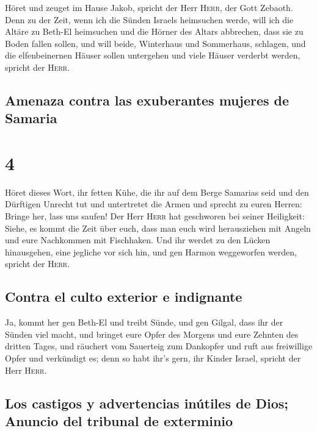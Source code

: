 Höret und zeuget im Hause Jakob, spricht der Herr
\textsc{Herr}, der Gott Zebaoth.  Denn zu der Zeit, wenn
ich die Sünden Israels heimsuchen werde, will ich die Altäre zu Beth-El
heimsuchen und die Hörner des Altars abbrechen, dass sie zu Boden fallen
sollen,  und will beide, Winterhaus und Sommerhaus,
schlagen, und die elfenbeinernen Häuser sollen untergehen und viele
Häuser verderbt werden, spricht der \textsc{Herr}.

\hypertarget{amenaza-contra-las-exuberantes-mujeres-de-samaria}{%
\subsection{Amenaza contra las exuberantes mujeres de
Samaria}\label{amenaza-contra-las-exuberantes-mujeres-de-samaria}}

\hypertarget{section-3}{%
\section{4}\label{section-3}}

 Höret dieses Wort, ihr fetten Kühe, die ihr auf dem Berge
Samarias seid und den Dürftigen Unrecht tut und untertretet die Armen
und sprecht zu euren Herren: Bringe her, lass uns saufen! 
Der Herr \textsc{Herr} hat geschworen bei seiner Heiligkeit: Siehe, es
kommt die Zeit über euch, dass man euch wird herausziehen mit Angeln und
eure Nachkommen mit Fischhaken.  Und ihr werdet zu den
Lücken hinausgehen, eine jegliche vor sich hin, und gen Harmon
weggeworfen werden, spricht der \textsc{Herr}.

\hypertarget{contra-el-culto-exterior-e-indignante}{%
\subsection{Contra el culto exterior e
indignante}\label{contra-el-culto-exterior-e-indignante}}

 Ja, kommt her gen Beth-El und treibt Sünde, und gen
Gilgal, dass ihr der Sünden viel macht, und bringet eure Opfer des
Morgens und eure Zehnten des dritten Tages,  und räuchert
vom Sauerteig zum Dankopfer und ruft aus freiwillige Opfer und
verkündigt es; denn so habt ihr's gern, ihr Kinder Israel, spricht der
Herr \textsc{Herr}.

\hypertarget{los-castigos-y-advertencias-inuxfatiles-de-dios-anuncio-del-tribunal-de-exterminio}{%
\subsection{Los castigos y advertencias inútiles de Dios; Anuncio del
tribunal de
exterminio}\label{los-castigos-y-advertencias-inuxfatiles-de-dios-anuncio-del-tribunal-de-exterminio}}

